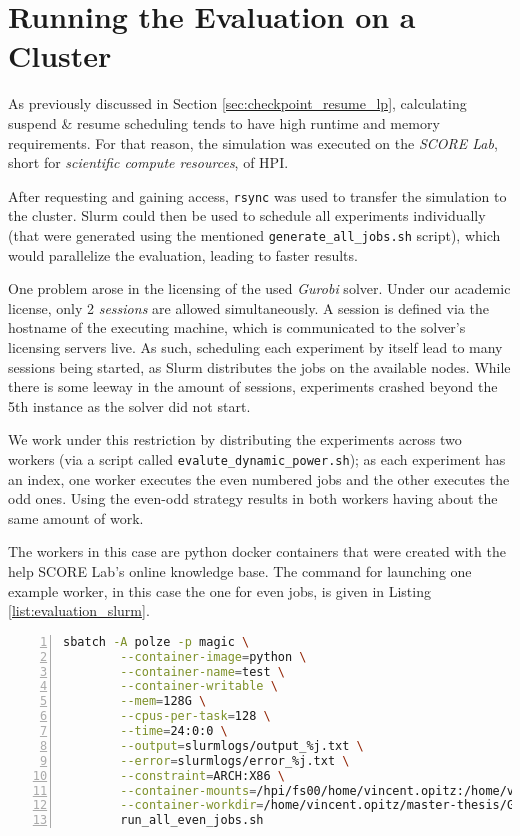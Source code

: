 
\section{Running the Evaluation on a Cluster}

As previously discussed in Section \ref{sec:checkpoint_resume_lp}, calculating suspend \& resume scheduling tends to have high runtime and memory requirements. 
For that reason, the simulation was executed on the \emph{SCORE Lab}, short for \emph{scientific compute resources}, of HPI.

After requesting and gaining access, \verb|rsync| was used to transfer the simulation to the cluster. 
Slurm could then be used to schedule all experiments individually (that were generated using the mentioned \verb|generate_all_jobs.sh| script), which would parallelize the evaluation, leading to faster results.

One problem arose in the licensing of the used \emph{Gurobi} solver. 
Under our academic license, only 2 \emph{sessions} are allowed simultaneously.
A session is defined via the hostname of the executing machine, which is communicated to the solver's licensing servers live.
As such, scheduling each experiment by itself lead to many sessions being started, as Slurm distributes the jobs on the available nodes.
While there is some leeway in the amount of sessions, experiments crashed beyond the 5th instance as the solver did not start.

We work under this restriction by distributing the experiments across two workers (via a script called \verb|evalute_dynamic_power.sh|); as each experiment has an index, one worker executes the even numbered jobs and the other executes the odd ones. 
Using the even-odd strategy results in both workers having about the same amount of work.

The workers in this case are python docker containers that were created with the help SCORE Lab's online knowledge base.
The command for launching one example worker, in this case the one for even jobs, is given in Listing \ref{list:evaluation_slurm}.

\begin{minipage}{\linewidth}
\begin{lstlisting}[language=bash, frame=single, numbers=left, caption={Executing the Evaluation inside the SCORE Lab's Slurm environment}, label={list:evaluation_slurm}, basicstyle=\ttfamily]
    sbatch -A polze -p magic \
        --container-image=python \
        --container-name=test \
        --container-writable \
        --mem=128G \
        --cpus-per-task=128 \
        --time=24:0:0 \
        --output=slurmlogs/output_%j.txt \
        --error=slurmlogs/error_%j.txt \
        --constraint=ARCH:X86 \
        --container-mounts=/hpi/fs00/home/vincent.opitz:/home/vincent.opitz \
        --container-workdir=/home/vincent.opitz/master-thesis/GAIA \
        run_all_even_jobs.sh
        \end{lstlisting}    
\end{minipage}

